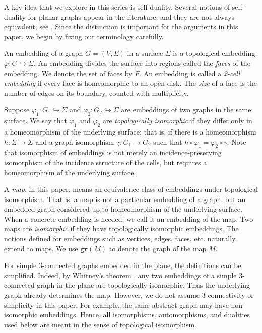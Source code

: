 \documentclass[10pt,a4paper]{article}
\newcommand{\gr}{\mathtt{gr}}
\begin{document}
A key idea that we explore in this series is self-duality. 
Several notions of self-duality for planar graphs appear in the literature, and they are not always equivalent; see \cite{servatius1996selfdual}. Since the distinction is important for the arguments in this paper, we begin by fixing our terminology carefully.


An embedding of a graph $G=(V,E)$ in a surface $\Sigma$ is a topological embedding $\varphi: G \hookrightarrow \Sigma$. An embedding divides the surface into regions called the \emph{faces} of the embedding. We denote the set of faces by $F$. An embedding is called a \emph{2-cell embedding} if every face is homeomorphic to an open disk. The \emph{size} of a face is the number of edges on its boundary, counted with multiplicity. 


 
 Suppose $\varphi_1:G_1\hookrightarrow \Sigma$  and $\varphi_2:G_2\hookrightarrow \Sigma$ are embeddings of two graphs in the same surface. We say that $\varphi_1$ and $\varphi_2$ are  \emph{topologically isomorphic} if they differ only in a homeomorphism of the underlying surface; that is, if there is a homeomorphism $h:\Sigma\rightarrow \Sigma$ and a graph isomorphism $\gamma:G_1\rightarrow G_2$ such that $h\circ\varphi_1 =\varphi_2\circ\gamma$. Note that isomorphism of embeddings is not merely an incidence-preserving isomorphism of the incidence structure of the cells, but requires a homeomorphism of the underlying surface.

 A \emph{map}, in this paper, means an equivalence class of embeddings under topological isomorphism. That is, a map is not a particular embedding of a graph, but an embedded graph considered up to homeomorphism of the underlying surface. When a concrete embedding is needed, we call it an embedding of the map. Two maps are \emph{isomorphic} if they have topologically isomorphic embeddings. The notions defined for embeddings such as  vertices, edges, faces, etc. naturally extend to maps.  We use $\gr(M)$ to denote the graph of the map $M$.


For simple 3-connected graphs embedded in the plane, the definitions can be simplified. Indeed, by Whitney's theorem \cite{whitney19332}, any two embeddings of a simple 3-connected graph in the plane are topologically isomorphic. Thus the underlying graph already determines the map.  
However, we do not assume 3-connectivity or simplicity in this paper. For example, the same abstract graph may have non-isomorphic embeddings. Hence, all isomorphisms, automorphisms, and dualities used below are meant in the sense of topological isomorphism.
\end{document}
